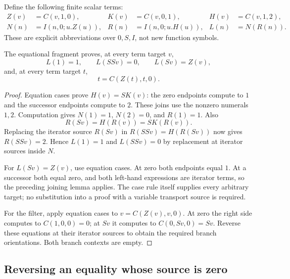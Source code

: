 Define the following finite scalar terms:
\[
\begin{aligned}
 Z(v)&=C(v,1,0),& K(v)&=C(v,0,1),& H(v)&=C(v,1,2),\\
 N(n)&=I(n,0;u.Z(u)),& R(n)&=I(n,0;u.H(u)),& L(n)&=N(R(n)).
\end{aligned}
\]
These are explicit abbreviations over $0,S,I$, not new function symbols.

\begin{lemma}
The equational fragment proves, at every term target $v$,
\[
 L(1)=1,\qquad L(SSv)=0,\qquad L(Sv)=Z(v),
 \tag{T}\label{eq:tests}
\]
and, at every term target $t$,
\[
 t=C(Z(t),t,0).
 \tag{F}\label{eq:filter}
\]
\end{lemma}
\begin{proof}
Equation cases prove $H(v)=S K(v)$: the zero endpoints compute to $1$
and the successor endpoints compute to $2$. These joins use the nonzero
numerals $1,2$. Computation gives $N(1)=1$, $N(2)=0$, and $R(1)=1$.
Also
\[
 R(Sv)=H(R(v))=S K(R(v)).
\]
Replacing the iterator source $R(Sv)$ in $R(SSv)=H(R(Sv))$ now gives
$R(SSv)=2$. Hence $L(1)=1$ and $L(SSv)=0$ by replacement at iterator
sources inside $N$.

For $L(Sv)=Z(v)$, use equation cases. At zero both endpoints equal $1$.
At a successor both equal zero, and both left-hand expressions are
iterator terms, so the preceding joining lemma applies. The case rule
itself supplies every arbitrary target; no substitution into a proof with
a variable transport source is required.

For the filter, apply equation cases to $v=C(Z(v),v,0)$. At zero the
right side computes to $C(1,0,0)=0$; at $Sv$ it computes to
$C(0,Sv,0)=Sv$. Reverse these equations at their iterator sources to
obtain the required branch orientations. Both branch contexts are empty.
\end{proof}

\subsection{Reversing an equality whose source is zero}

